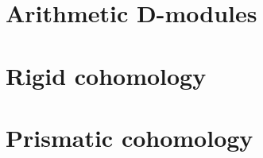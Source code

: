        \chapter{Arithmetic D-modules}
            \begin{abstract}
                
            \end{abstract}
            
            \minitoc
            
            
            
            
            
            
            
        \chapter{Rigid cohomology}
            \begin{abstract}
                
            \end{abstract}
            
            \minitoc
            
            
            
            
            
            
    
        \chapter{Prismatic cohomology}
            \begin{abstract}
                
            \end{abstract}
            
            \minitoc
            
            
            
            
            
